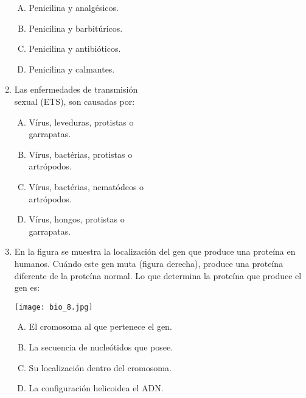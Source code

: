 \begin{enumerate}
\begin{enumerate}[(A)]
\item Penicilina y analgésicos. 
\item Penicilina y barbitúricos. 
\item Penicilina y antibióticos. 
\item Penicilina y calmantes. 
\end{enumerate}

\item  Las enfermedades de transmisión\\ sexual (ETS), son causadas por:\label{bio-13}

\begin{enumerate}[(A)]
\item Vírus, leveduras, protistas o\\ garrapatas. 
\item Vírus, bactérias, protistas o\\ artrópodos. 
\item Vírus, bactérias, nematódeos o\\ artrópodos. 
\item Vírus, hongos, protistas o\\ garrapatas.
\end{enumerate}

\item En la figura se muestra  la localización  del gen que produce una proteína en humanos. Cuándo este gen muta (figura    derecha), produce una proteína diferente de la proteína normal. Lo que determina la proteína que produce el gen es:  \label{bio-14}
\begin{center}
\texttt{[image: bio\_8.jpg]} 
\end{center}
\begin{enumerate}[(A)]
\item El  cromosoma  al  que pertenece  el gen.
\item La secuencia de  nucleótidos  que posee.
\item Su  localización dentro   del cromosoma.
\item La  configuración  helicoidea el ADN.	
\end{enumerate}



\end{enumerate}
